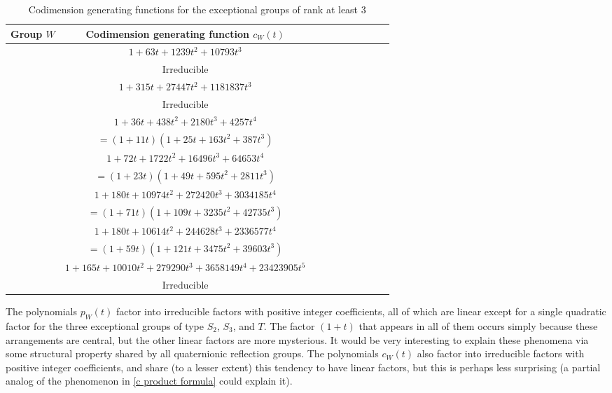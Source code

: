 \documentclass[11pt, reqno]{amsart}
\numberwithin{equation}{section}
\theoremstyle{definition}
\theoremstyle{plain}
\begin{document}
\begin{table}[h]
\caption{Codimension generating functions for the exceptional groups of rank at least $3$}
\centering
\begin{tabular}{l c c rrrrrrr}
\hline \hline
Group $W$  &\multicolumn{1}{c}{Codimension generating function $c_W(t)$}
\\ [0.5ex]
\hline 
&$1+63t+1239t^2+10793t^3$ \\[-1ex]
\raisebox{1.5ex}{$W(Q)$} & Irreducible    \\[1ex]

&$1+315t+27447t^2+1181837t^3$ \\[-1ex]
\raisebox{1.5ex}{$W(R)$} & Irreducible   \\[1ex]

&$1+36t+438t^2+2180t^3+4257t^4$ \\[-1ex]
\raisebox{1.5ex}{$W(S_1)$} &   $=(1+11t)(1+25t+163t^2+387t^3)$ \\[1ex]

&$1+72t+1722t^2+16496t^3+64653t^4$ \\[-1ex]
\raisebox{1.5ex}{$W(S_2)$} &   $=(1+23t)(1+49t+595t^2+2811t^3)$ \\[1ex]

&$1+180t+10974t^2+272420t^3+3034185t^4$ \\[-1ex]
\raisebox{1.5ex}{$W(S_3)$} &   $=(1+71t)(1+109t+3235t^2+42735t^3)$ \\[1ex]

&$1+180t+10614t^2+244628t^3+2336577t^4$ \\[-1ex]
\raisebox{1.5ex}{$W(T)$} &   $=(1+59t)(1+121t+3475t^2+39603t^3)$ \\[1ex]

& $1+165t+10010t^2+279290t^3+3658149t^4+23423905t^5$ \\[-1ex]
\raisebox{1.5ex}{$W(U)$} &   Irreducible \\[1ex]
\hline 
\end{tabular}
\label{tab:PPer}
\end{table}

\newpage

The polynomials $p_W(t)$ factor into irreducible factors with positive integer coefficients, all of which are linear except for a single quadratic factor for the three exceptional groups of type $S_2$, $S_3$, and $T$. The factor $(1+t)$ that appears in all of them occurs simply because these arrangements are central, but the other linear factors are more mysterious. It would be very interesting to explain these phenomena via some structural property shared by all quaternionic reflection groups. The polynomials $c_W(t)$ also factor into irreducible factors with positive integer coefficients, and share (to a lesser extent) this tendency to have linear factors, but this is perhaps less surprising (a partial analog of the phenomenon in \ref{c product formula} could explain it).
\end{document}
